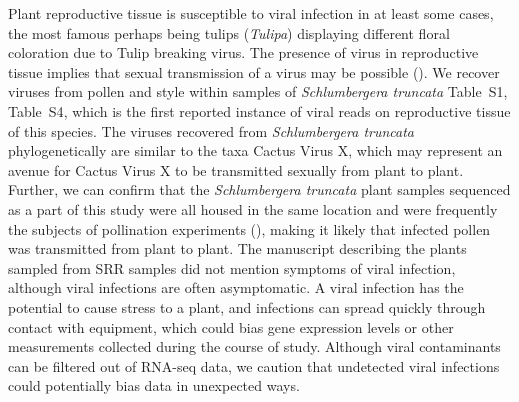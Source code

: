 \documentclass[fleqn,10pt,lineno]{wlpeerj}
\begin{document}
{Plant reproductive tissue is susceptible to viral infection in at least some cases, the most famous perhaps being tulips (\textit{Tulipa}) displaying different floral coloration due to Tulip breaking virus.
The presence of virus in reproductive tissue implies that sexual transmission of a virus may be possible (\citealt{Kim_2015}).
We recover viruses from pollen and style within samples of \textit{Schlumbergera truncata} {Table~S1, Table~S4}, which is the first reported instance of viral reads on reproductive tissue of this species.
The viruses recovered from \textit{Schlumbergera truncata} phylogenetically are similar to the taxa Cactus Virus X, which may represent an avenue for Cactus Virus X to be transmitted sexually from plant to plant.
Further, we can confirm that the \textit{Schlumbergera truncata} plant samples sequenced as a part of this study were all housed in the same location and were frequently the subjects of pollination experiments (\citealt{ramanauskas2021}), making it likely that infected pollen was transmitted from plant to plant.
The manuscript describing the plants sampled from SRR samples did not mention symptoms of viral infection, although viral infections are often asymptomatic.
A viral infection has the potential to cause stress to a plant, and infections can spread quickly through contact with equipment, which could bias gene expression levels or other measurements collected during the course of study.
Although viral contaminants can be filtered out of RNA-seq data, we caution that undetected viral infections could potentially bias data in unexpected ways.

}
\end{document}
